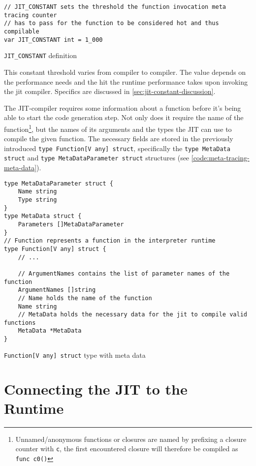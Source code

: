 \begin{listing}[H]
    \begin{verbatim}
// JIT_CONSTANT sets the threshold the function invocation meta tracing counter
// has to pass for the function to be considered hot and thus compilable
var JIT_CONSTANT int = 1_000
    \end{verbatim}
    \caption{\texttt{JIT\_CONSTANT} definition}
    \label{code:jit-constant}
\end{listing}

This constant threshold varies from compiler to compiler. The value depends on
the performance needs and the hit the runtime performance takes upon
invoking the jit compiler. Specifics are discussed in \autoref{sec:jit-constant-discussion}.

The JIT-compiler requires some information about a function before it's being
able to start the code generation step. Not only does it require the name of
the function\footnote{Unnamed/anonymous functions or closures are named by
prefixing a closure counter with \texttt{c}, the first encountered closure
will therefore be compiled as \texttt{func c0()}}, but the names of its
arguments and the types the JIT can use to compile the given function. The
necessary fields are stored in the previously introduced \texttt{type Function[V any] struct},
specifically the \texttt{type MetaData struct}
and \texttt{type MetaDataParameter struct} structures (see
\autoref{code:meta-tracing-meta-data}).

\begin{listing}[H]
    \begin{verbatim}
type MetaDataParameter struct {
	Name string
	Type string
}
type MetaData struct {
	Parameters []MetaDataParameter
}
// Function represents a function in the interpreter runtime
type Function[V any] struct {
    // ...

    // ArgumentNames contains the list of parameter names of the function
    ArgumentNames []string
    // Name holds the name of the function
    Name string
    // MetaData holds the necessary data for the jit to compile valid functions
    MetaData *MetaData
}
    \end{verbatim}
    \caption{\texttt{Function[V any] struct} type with meta data}
    \label{code:meta-tracing-meta-data}
\end{listing}

\section{Connecting the JIT to the Runtime}


